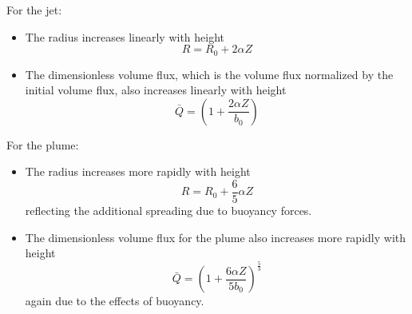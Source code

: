 For the jet:
\begin{itemize}
    \item The radius increases linearly with height \begin{equation}R = R_0 + 2\alpha Z\end{equation}
    \item The dimensionless volume flux, which is the volume flux normalized by the initial volume flux, also increases linearly with height \begin{equation}\bar{Q} = \left(1 + \frac{2\alpha Z}{b_0}\right)\end{equation}
\end{itemize}
For the plume:
\begin{itemize}
    \item The radius increases more rapidly with height \begin{equation}R = R_0 + \frac{6}{5}\alpha Z\end{equation} reflecting the additional spreading due to buoyancy forces.
    \item The dimensionless volume flux for the plume also increases more rapidly with height \begin{equation}\bar{Q} = \left(1 + \frac{6\alpha Z}{5b_0}\right)^{\frac{5}{3}}\end{equation} again due to the effects of buoyancy.
\end{itemize}
